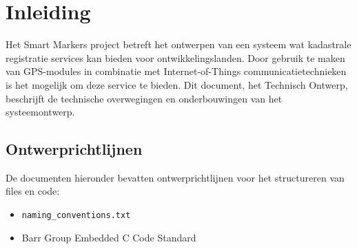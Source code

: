 \section{Inleiding}
Het Smart Markers project betreft het ontwerpen van een systeem wat kadastrale registratie services kan bieden voor ontwikkelingslanden. Door gebruik te maken van GPS-modules in combinatie met Internet-of-Things communicatietechnieken is het mogelijk om deze service te bieden. Dit document, het Technisch Ontwerp, beschrijft de technische overwegingen en onderbouwingen van het systeemontwerp.

\subsection{Ontwerprichtlijnen}
De documenten hieronder bevatten ontwerprichtlijnen voor het structureren van files en code:
\begin{itemize}
    \item \texttt{naming\_conventions.txt}
    \item Barr Group Embedded C Code Standard \citep{BARR_STD}
\end{itemize}
